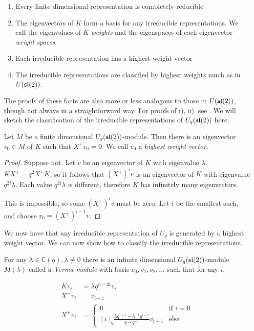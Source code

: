 \begin{enumerate}
    \renewcommand{\labelenumi}{\roman{enumi})}
    \item Every finite dimensional representation is completely reducible
    \item The eigenvectors of $K$ form a basis for any irreducible representations. We call the eigenvalues of $K$ \emph{weights} and the eigenspaces of each eigenvector \emph{weight spaces}.
    \item Each irreducible representation has a highest weight vector
    \item The irreducible representations are classified by highest weights much as in $U(\mathfrak{sl}(2))$.
\end{enumerate}

The proofs of these facts are also more or less analogous to those in
$U(\mathfrak{sl}(2))$, though not always in a straightforward way. For proofs of i),
ii), see \cite{Kassel1994}. We will sketch the classification of the
irreducible representations of $U_q(\mathfrak{sl}(2))$ here.

\begin{claim}
\label{claim:HighestWeight}
    Let $M$ be a finite dimensional $U_q(\mathfrak{sl}(2))$-module. Then there is an
    eigenvector $v_0 \in M$ of $K$ such that $ X^+ v_0 = 0$. We call $v_0$ a
    \emph{highest weight vector}.
\end{claim}

\begin{proof}

    Suppose not. Let $v$ be an eigenvector of $K$ with eigenvalue $\lambda$.
    $K X^+ = q^2  X^+ K$, so it follows that $(X^+)^i v$ is an
    eigenvector of $K$ with eigenvalue $q^{2i}\lambda$. Each value
    $q^{2i}\lambda$ is different, therefore $K$ has infinitely many
    eigenvectors. 

    This is impossible, so some $(X^+)^i v$ must be zero. Let $i$ be the
    smallest such, and choose $v_0 = (X^+)^{i-1} v$.
\end{proof}

We now have that any irreducible representation of $U_q$ is generated by a
highest weight vector. We can now show how to classify the irreducible
representations. 

For any $\lambda \in \mathbb{C}(q), \lambda \neq 0$ there is an infinite
dimensional $U_q(\mathfrak{sl}(2))$-module $M(\lambda)$ called a \emph{Verma module}
with basis $v_0, v_1, v_2, \ldots$ such that for any $i$,

\begin{align}
    Kv_i &= \lambda q^{n-2i}v_i \\
    X^-v_i &= v_{i+1} \\
     X^+ v_i &= \begin{cases} 0 & \text{if $i = 0$} \\
                          [i]_q \frac{\lambda q^{1-i} - \lambda^{-1}q^{i-1}}{q - q^{-1}}v_{i-1} & \text{else}
            \end{cases}
\end{align}

